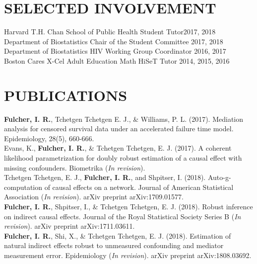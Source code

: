 \documentclass[12pt]{article}
\begin{document}
\vspace{-.2cm}
\section*{\textbf{{\large S}{ELECTED} {\large I}{NVOLVEMENT}}}
Harvard T.H. Chan School of Public Health Student Tutor\hfill \hfill 2017, 2018 \\
Department of Biostatistics Chair of the Student Committee \hfill \hfill 2017, 2018 \\
Department of Biostatistics HIV Working Group Coordinator \hfill \hfill 2016, 2017 \\
Boston Cares X-Cel Adult Education Math HiSeT Tutor \hfill \hfill 2014, 2015, 2016 \\

\section*{\textbf{{\large P}{UBLICATIONS}}}

\textbf{Fulcher, I. R.}, Tchetgen Tchetgen E. J., \& Williams, P. L. (2017). Mediation analysis for censored survival data under an accelerated failure time model.  Epidemiology, 28(5), 660-666. \\

Evans, K., \textbf{Fulcher, I. R.}, \& Tchetgen Tchetgen, E. J. (2017). A coherent likelihood parametrization for doubly robust estimation of a causal effect with missing confounders. Biometrika (\textit{In revision}). \\

Tchetgen Tchetgen, E. J., \textbf{Fulcher, I. R.}, and Shpitser, I. (2018). Auto-g-computation of causal effects on a network. Journal of American Statistical Association (\textit{In revision}). arXiv preprint arXiv:1709.01577. \\

\textbf{Fulcher, I. R.}, Shpitser, I., \& Tchetgen Tchetgen, E. J. (2018). Robust inference on indirect causal effects.  Journal of the Royal Statistical Society Series B (\textit{In revision}). arXiv preprint arXiv:1711.03611. \\

\textbf{Fulcher, I. R.}, Shi, X., \& Tchetgen Tchetgen, E. J. (2018). Estimation of natural indirect effects robust to unmeasured confounding and mediator measurement error. Epidemiology (\textit{In revision}). arXiv preprint arXiv:1808.03692.
\end{document}
